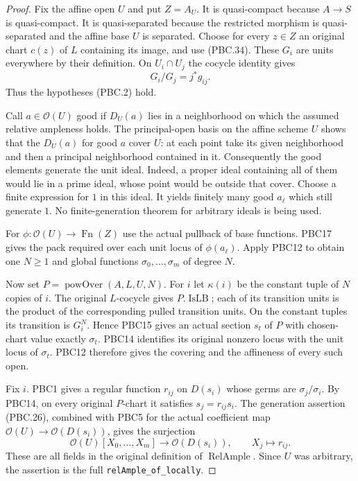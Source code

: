 \begin{proof}
Fix the affine open $U$ and put $Z=A_U$.
It is quasi-compact because $A\to S$ is quasi-compact.
It is quasi-separated because the restricted morphism is
quasi-separated and the affine base $U$ is separated.
Choose for every $z\in Z$ an original chart $c(z)$ of $L$
containing its image, and use (PBC.34).
These $G_i$ are units everywhere by their definition.
On $U_i\cap U_j$ the cocycle identity gives
\[
 G_i/G_j=j^*g_{ij}.
                                                        \tag{PBC.35}
\]
Thus the hypotheses (PBC.2) hold.

Call $a\in\mathcal O(U)$ good if $D_U(a)$ lies in a
neighborhood on which the assumed relative ampleness holds.
The principal-open basis on the affine scheme $U$ shows
that the $D_U(a)$ for good $a$ cover $U$:
at each point take its given neighborhood and then a
principal neighborhood contained in it.
Consequently the good elements generate the unit ideal.
Indeed, a proper ideal containing all of them would lie
in a prime ideal, whose point would be outside that cover.
Choose a finite expression for $1$ in this ideal.
It yields finitely many good $a_\ell$ which still generate $1$.
No finite-generation theorem for arbitrary ideals is being used.

For $\phi:\mathcal O(U)\to\operatorname{Fn}(Z)$ use the
actual pullback of base functions.  PBC17 gives the pack
required over each unit locus of $\phi(a_\ell)$.
Apply PBC12 to obtain one $N\ge1$ and global functions
$\sigma_0,\ldots,\sigma_m$ of degree $N$.

Now set $P=\operatorname{powOver}(A,L,U,N)$.
For $i$ let $\kappa(i)$ be the constant tuple of $N$
copies of $i$.  The original $L$-cocycle gives $P.\operatorname{IsLB}$;
each of its transition units is the product of the corresponding
pulled transition units.  On the constant tuples its transition
is $G_i^N$.  Hence PBC15 gives an actual section $s_t$ of
$P$ with chosen-chart value exactly $\sigma_t$.
PBC14 identifies its original nonzero locus with the unit
locus of $\sigma_t$.  PBC12 therefore gives the covering
and the affineness of every such open.

Fix $i$.  PBC1 gives a regular function
$r_{ij}$ on $D(s_i)$ whose germs are $\sigma_j/\sigma_i$.
By PBC14, on every original $P$-chart it satisfies
$s_j=r_{ij}s_i$.  The generation assertion (PBC.26),
combined with PBC5 for the actual coefficient map
$\mathcal O(U)\to\mathcal O(D(s_i))$, gives the surjection
\[
 \mathcal O(U)[X_0,\ldots,X_m]\longrightarrow
       \mathcal O(D(s_i)),\qquad X_j\longmapsto r_{ij}.
                                                        \tag{PBC.36}
\]
These are all fields in the original definition of
$\operatorname{RelAmple}$.  Since $U$ was arbitrary, the
assertion is the full \texttt{relAmple\_of\_locally}.
\end{proof}

